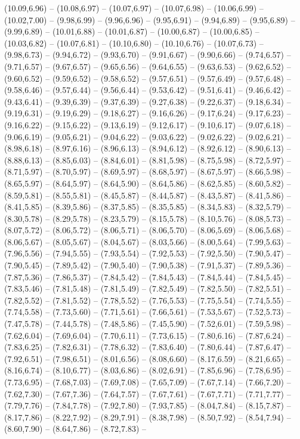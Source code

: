 \expandafter\def\csname geo:gebiet:DE-SN\endcsname{
  (10.09,6.96) -- (10.08,6.97) -- (10.07,6.97) -- (10.07,6.98) -- (10.06,6.99) -- (10.02,7.00) -- (9.98,6.99) -- (9.96,6.96) -- (9.95,6.91) -- (9.94,6.89) -- (9.95,6.89) -- (9.99,6.89) -- (10.01,6.88) -- (10.01,6.87) -- (10.00,6.87) -- (10.00,6.85) -- (10.03,6.82) -- (10.07,6.81) -- (10.10,6.80) -- (10.10,6.76) -- (10.07,6.73) -- (9.98,6.73) -- (9.94,6.72) -- (9.93,6.70) -- (9.91,6.67) -- (9.90,6.66) -- (9.74,6.57) -- (9.71,6.57) -- (9.67,6.57) -- (9.65,6.56) -- (9.64,6.55) -- (9.63,6.53) -- (9.62,6.52) -- (9.60,6.52) -- (9.59,6.52) -- (9.58,6.52) -- (9.57,6.51) -- (9.57,6.49) -- (9.57,6.48) -- (9.58,6.46) -- (9.57,6.44) -- (9.56,6.44) -- (9.53,6.42) -- (9.51,6.41) -- (9.46,6.42) -- (9.43,6.41) -- (9.39,6.39) -- (9.37,6.39) -- (9.27,6.38) -- (9.22,6.37) -- (9.18,6.34) -- (9.19,6.31) -- (9.19,6.29) -- (9.18,6.27) -- (9.16,6.26) -- (9.17,6.24) -- (9.17,6.23) -- (9.16,6.22) -- (9.15,6.22) -- (9.13,6.19) -- (9.12,6.17) -- (9.10,6.17) -- (9.07,6.18) -- (9.06,6.19) -- (9.05,6.21) -- (9.04,6.22) -- (9.03,6.22) -- (9.02,6.22) -- (9.02,6.21) -- (8.98,6.18) -- (8.97,6.16) -- (8.96,6.13) -- (8.94,6.12) -- (8.92,6.12) -- (8.90,6.13) -- (8.88,6.13) -- (8.85,6.03) -- (8.84,6.01) -- (8.81,5.98) -- (8.75,5.98) -- (8.72,5.97) -- (8.71,5.97) -- (8.70,5.97) -- (8.69,5.97) -- (8.68,5.97) -- (8.67,5.97) -- (8.66,5.98) -- (8.65,5.97) -- (8.64,5.97) -- (8.64,5.90) -- (8.64,5.86) -- (8.62,5.85) -- (8.60,5.82) -- (8.59,5.81) -- (8.55,5.81) -- (8.45,5.87) -- (8.44,5.87) -- (8.43,5.87) -- (8.41,5.86) -- (8.41,5.85) -- (8.39,5.86) -- (8.37,5.85) -- (8.35,5.85) -- (8.34,5.83) -- (8.32,5.79) -- (8.30,5.78) -- (8.29,5.78) -- (8.23,5.79) -- (8.15,5.78) -- (8.10,5.76) -- (8.08,5.73) -- (8.07,5.72) -- (8.06,5.72) -- (8.06,5.71) -- (8.06,5.70) -- (8.06,5.69) -- (8.06,5.68) -- (8.06,5.67) -- (8.05,5.67) -- (8.04,5.67) -- (8.03,5.66) -- (8.00,5.64) -- (7.99,5.63) -- (7.96,5.56) -- (7.94,5.55) -- (7.93,5.54) -- (7.92,5.53) -- (7.92,5.50) -- (7.90,5.47) -- (7.90,5.45) -- (7.89,5.42) -- (7.90,5.40) -- (7.90,5.38) -- (7.91,5.37) -- (7.89,5.36) -- (7.87,5.36) -- (7.86,5.37) -- (7.84,5.42) -- (7.84,5.43) -- (7.84,5.44) -- (7.84,5.45) -- (7.83,5.46) -- (7.81,5.48) -- (7.81,5.49) -- (7.82,5.49) -- (7.82,5.50) -- (7.82,5.51) -- (7.82,5.52) -- (7.81,5.52) -- (7.78,5.52) -- (7.76,5.53) -- (7.75,5.54) -- (7.74,5.55) -- (7.74,5.58) -- (7.73,5.60) -- (7.71,5.61) -- (7.66,5.61) -- (7.53,5.67) -- (7.52,5.73) -- (7.47,5.78) -- (7.44,5.78) -- (7.48,5.86) -- (7.45,5.90) -- (7.52,6.01) -- (7.59,5.98) -- (7.62,6.04) -- (7.69,6.04) -- (7.70,6.11) -- (7.73,6.15) -- (7.80,6.16) -- (7.87,6.24) -- (7.83,6.25) -- (7.82,6.31) -- (7.78,6.32) -- (7.83,6.40) -- (7.80,6.44) -- (7.87,6.47) -- (7.92,6.51) -- (7.98,6.51) -- (8.01,6.56) -- (8.08,6.60) -- (8.17,6.59) -- (8.21,6.65) -- (8.16,6.74) -- (8.10,6.77) -- (8.03,6.86) -- (8.02,6.91) -- (7.85,6.96) -- (7.78,6.95) -- (7.73,6.95) -- (7.68,7.03) -- (7.69,7.08) -- (7.65,7.09) -- (7.67,7.14) -- (7.66,7.20) -- (7.62,7.30) -- (7.67,7.36) -- (7.64,7.57) -- (7.67,7.61) -- (7.67,7.71) -- (7.71,7.77) -- (7.79,7.76) -- (7.84,7.78) -- (7.92,7.80) -- (7.93,7.85) -- (8.04,7.84) -- (8.15,7.87) -- (8.17,7.86) -- (8.22,7.92) -- (8.29,7.91) -- (8.38,7.98) -- (8.50,7.92) -- (8.54,7.94) -- (8.60,7.90) -- (8.64,7.86) -- (8.72,7.83) -- }
